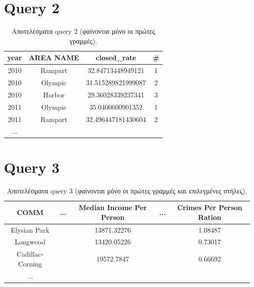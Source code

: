 \documentclass[a4paper,12pt]{article}
\begin{document}
\begin{otherlanguage}{greek}
\section*{Query 2}
	\lipsum[2] %
	\FloatBarrier
	\begin{table}[h]
		\centering
		\begin{tabular}{cccc}
			year & AREA NAME & closed\_rate & \# \\
			\hline
			2010 & Rampart & 32.84713448949121 & 1 \\
			2010 & Olympic & 31.515289821999087 & 2 \\
			2010 & Harbor & 29.36028339237341 & 3 \\
			2011 & Olympic & 35.0400600901352 & 1 \\
			2011 & Rampart & 32.496447181430604 & 2 \\
			...
		\end{tabular}
		\caption{Aποτελέσματα query 2 (φαίνονται μόνο οι 
		πρώτες γραμμές).}
	\end{table}
	\FloatBarrier

\section*{Query 3}
	\lipsum[3] %
	\FloatBarrier
	\begin{table}[h]
		\centering
		\begin{tabular}{ccccc}
			COMM & ... & Median Income Per Person & ... & 
			Crimes Per Person Ration \\
			\hline
			Elysian Park & & 13871.32276 & & 1.08487 \\ 
			Longwood & & 13420.05226 & & 0.73017 \\
			Cadillac-Corning & & 19572.7847 & & 0.66692 \\
			...
		\end{tabular}
		\caption{Aποτελέσματα query 3 (φαίνονται μόνο οι 
		πρώτες γραμμές και επιλεγμένες στήλες).}
	\end{table}
	\FloatBarrier


\end{otherlanguage}
\end{document}
